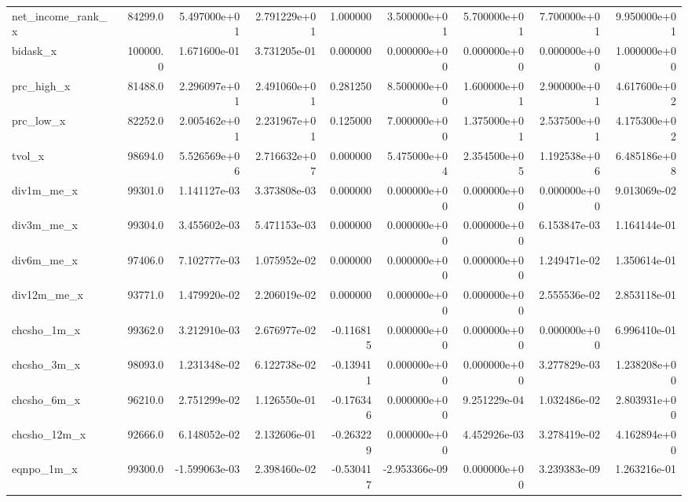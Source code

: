 \documentclass[10pt]{article}
\begin{document}
\begin{landscape}
\begin{longtable}{lrrrrrrrr}
net\_income\_rank\_x       &   84299.0 &  5.497000e+01 &  2.791229e+01 &      1.000000 &  3.500000e+01 &  5.700000e+01 &  7.700000e+01 &  9.950000e+01 \\
bidask\_x                &  100000.0 &  1.671600e-01 &  3.731205e-01 &      0.000000 &  0.000000e+00 &  0.000000e+00 &  0.000000e+00 &  1.000000e+00 \\
prc\_high\_x              &   81488.0 &  2.296097e+01 &  2.491060e+01 &      0.281250 &  8.500000e+00 &  1.600000e+01 &  2.900000e+01 &  4.617600e+02 \\
prc\_low\_x               &   82252.0 &  2.005462e+01 &  2.231967e+01 &      0.125000 &  7.000000e+00 &  1.375000e+01 &  2.537500e+01 &  4.175300e+02 \\
tvol\_x                  &   98694.0 &  5.526569e+06 &  2.716632e+07 &      0.000000 &  5.475000e+04 &  2.354500e+05 &  1.192538e+06 &  6.485186e+08 \\
div1m\_me\_x              &   99301.0 &  1.141127e-03 &  3.373808e-03 &      0.000000 &  0.000000e+00 &  0.000000e+00 &  0.000000e+00 &  9.013069e-02 \\
div3m\_me\_x              &   99304.0 &  3.455602e-03 &  5.471153e-03 &      0.000000 &  0.000000e+00 &  0.000000e+00 &  6.153847e-03 &  1.164144e-01 \\
div6m\_me\_x              &   97406.0 &  7.102777e-03 &  1.075952e-02 &      0.000000 &  0.000000e+00 &  0.000000e+00 &  1.249471e-02 &  1.350614e-01 \\
div12m\_me\_x             &   93771.0 &  1.479920e-02 &  2.206019e-02 &      0.000000 &  0.000000e+00 &  0.000000e+00 &  2.555536e-02 &  2.853118e-01 \\
chcsho\_1m\_x             &   99362.0 &  3.212910e-03 &  2.676977e-02 &     -0.116815 &  0.000000e+00 &  0.000000e+00 &  0.000000e+00 &  6.996410e-01 \\
chcsho\_3m\_x             &   98093.0 &  1.231348e-02 &  6.122738e-02 &     -0.139411 &  0.000000e+00 &  0.000000e+00 &  3.277829e-03 &  1.238208e+00 \\
chcsho\_6m\_x             &   96210.0 &  2.751299e-02 &  1.126550e-01 &     -0.176346 &  0.000000e+00 &  9.251229e-04 &  1.032486e-02 &  2.803931e+00 \\
chcsho\_12m\_x            &   92666.0 &  6.148052e-02 &  2.132606e-01 &     -0.263229 &  0.000000e+00 &  4.452926e-03 &  3.278419e-02 &  4.162894e+00 \\
eqnpo\_1m\_x              &   99300.0 & -1.599063e-03 &  2.398460e-02 &     -0.530417 & -2.953366e-09 &  0.000000e+00 &  3.239383e-09 &  1.263216e-01 \\

\end{longtable}
\end{landscape}
\end{document}
